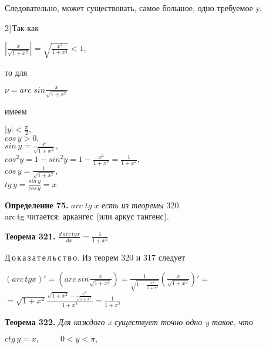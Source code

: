 \documentclass[12pt,a5paper]{book}
\def \tab{3ex}
\begin{document}
    \newpage
    \pagestyle{fancy}
    \hspace{-\tab}Следовательно, может существовать, самое большое, одно требуемое y.
    
    2)Так как
    \begin{center}
        $\displaystyle|\frac{x}{\sqrt{1+x^2}}|=\sqrt{\frac{x^2}{1+x^2}}<1$,
    \end{center}
    
    \hspace{-\tab}то для
    \begin{center}
        $\displaystyle\nu=arc\;sin{\frac{x}{\sqrt{1+x^2}}}$
    \end{center}
    
    \hspace{-\tab}имеем
    \begin{center}
        $|y|<\displaystyle\frac{\pi}{2},$\\
        $cos\,y>0,$\\
        $sin\,y=\displaystyle\frac{x}{\sqrt{1+x^2}},$\\
        $cos^2y=1-sin^2y=1-\displaystyle\frac{x^2}{1+x^2}=\frac{1}{1+x^2},$\\
        $cos\,y=\displaystyle\frac{1}{\sqrt{1+x^2}},$\\
        $tg\,y=\displaystyle\frac{sin\,y}{cos\,y}=x.$
    \end{center}
    
    \textbf{Определение 75. }$arc\;tg\;x$ \textit{есть из теоремы} 320.\\
    arc\,tg читается: аркангес (или аркус тангенс).
    
    \textbf{Теорема 321.  } $\displaystyle\frac{d\,arc\,tgx}{dx}=\frac{1}{1+x^2}$
    
    Д\,о\,к\,а\,з\,а\,т\,е\,л\,ь\,с\,т\,в\,о. Из теорем 320 и 317 следует
    \begin{center}
        $(arc\,tgx)'=(arc\,sin\displaystyle\frac{x}{\sqrt{1+x^2}})=\frac{1}{\sqrt{1-\frac{x^2}{1+x^2}}}(\frac{x}{\sqrt{1+x^2}})'=$\\
        $\displaystyle=\sqrt{1+x^2}\frac{\sqrt{1+x^2}-\frac{x^2}{\sqrt{1+x^2}}}{1+x^2}=\frac{1}{1+x^2}$
    \end{center}
    
    \textbf{Теорема 322. }\textit{Для каждого x существует точно одно y такое, что}
    \begin{center}
        $ctg\,y=x, \;\;\;\;\;\;\;\;\; 0<y<\pi,$
    \end{center}
\end{document}
